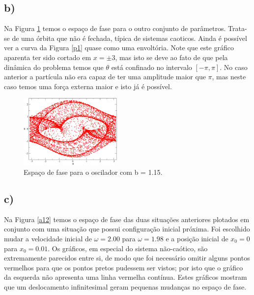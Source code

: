 \documentclass[a4wide]{report}
\begin{document}
\vspace{3pt}
\subsection*{b)}
Na Figura \ref{p2} temos o espaço de fase para o outro conjunto de parâmetros. Trata-se de uma órbita que não é fechada, típica de sistemas caoticos. Ainda é possível ver a curva da Figura \ref{p1} quase como uma envoltória. Note que este gráfico aparenta ter sido cortado em $x = \pm3$, mas isto se deve ao fato de que pela dinâmica do problema temos que $\theta$ está confinado no intervalo $\left[ -\pi,\pi\right]$. No caso anterior a partícula não era capaz de ter uma amplitude maior que $\pi$, mas neste caso temos uma força externa maior e isto já é possível.

\begin{figure}[!htb]
\centering
\includegraphics[width=0.447\textwidth]{p2.pdf}
\caption{ Espaço de fase para o oscilador com b = 1.15.  }
\label{p2}
\end{figure}



\subsection*{c)}

Na Figura \ref{a12} temos o espaço de fase das duas situações anteriores plotados em conjunto com uma situação que possui configuração inicial próxima. Foi escolhido mudar a velocidade inicial de $\omega = 2.00$ para $\omega = 1.98$ e a posição inicial de $x_0 = 0$ para $x_0 = 0.01$. Os gráficos, em especial do sistema não-caótico, são extremamente parecidos entre si, de modo que foi necessário omitir alguns pontos vermelhos para que os pontos pretos pudessem ser vistos; por isto que o gráfico da esquerda não apresenta uma linha vermelha contínua. Estes gráficos mostram que um deslocamento infinitesimal geram pequenas mudanças no espaço de fase.
\end{document}
